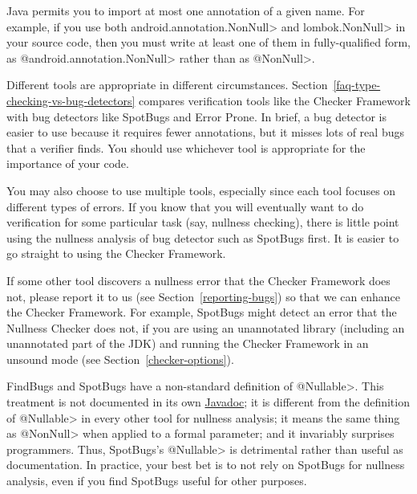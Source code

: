 Java permits you to import at most one annotation of a given name.  For
example, if you use both \<android.annotation.NonNull> and
\<lombok.NonNull> in your source code, then you must write at least one of
them in fully-qualified form, as \<@android.annotation.NonNull> rather than
as \<@NonNull>.



Different tools are appropriate in different circumstances.
Section~\ref{faq-type-checking-vs-bug-detectors} compares verification
tools like the Checker Framework with bug detectors like SpotBugs and Error
Prone.  In brief, a bug detector is easier to use because it requires fewer
annotations, but it misses lots of real bugs that a verifier finds.  You
should use whichever tool is appropriate for the importance of your code.

You may also choose to use multiple tools, especially since each tool
focuses on different types of errors.  If you know that you will eventually
want to do verification for some particular task (say, nullness checking),
there is little point using the nullness analysis of bug detector such as
SpotBugs first.  It is easier to go straight to using the
Checker Framework.

If some other tool discovers a nullness error that the Checker
Framework does not, please report it to us (see
Section~\ref{reporting-bugs}) so that we can enhance the Checker Framework.
For example, SpotBugs might detect an error that the Nullness Checker does
not, if you are using an unannotated library (including an unannotated
part of the JDK) and running the Checker Framework in an unsound mode (see
Section~\ref{checker-options}).



FindBugs and SpotBugs have a non-standard definition of
\<@Nullable>.  This treatment is not documented in its own
\href{https://www.javadoc.io/doc/com.github.spotbugs/spotbugs-annotations/latest/edu/umd/cs/findbugs/annotations/Nullable.html}{Javadoc};
it is different from the definition of \<@Nullable> in every other tool for
nullness analysis; it means the same thing as \<@NonNull> when applied to a
formal parameter; and it invariably surprises programmers.  Thus, SpotBugs's
\<@Nullable> is detrimental rather than useful as documentation.
In practice, your best bet is to not rely on SpotBugs for nullness analysis,
even if you find SpotBugs useful for other purposes.

